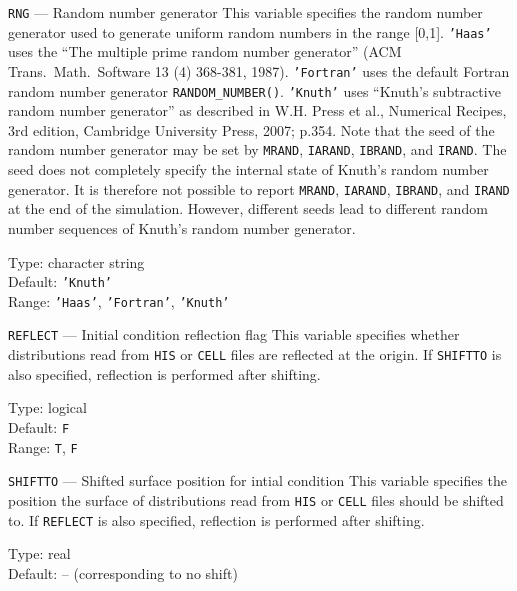 \begin{keydescription}{\texttt{RNG} --- Random number generator}
%
  This variable specifies the random number generator used to generate uniform
  random numbers in the range [0,1]. \texttt{'Haas'} uses the ``The multiple 
  prime random number generator'' (ACM Trans.\ Math.\ Software 13 (4) 368-381, 
  1987). \texttt{'Fortran'} uses the default Fortran random number generator 
  \texttt{RANDOM\_NUMBER()}. \texttt{'Knuth'} uses ``Knuth's subtractive random 
  number generator'' as described in W.H. Press et al., Numerical Recipes, 3rd 
  edition, Cambridge University Press, 2007; p.354. Note that the seed of the
  random number generator may be set by \texttt{MRAND}, \texttt{IARAND}, 
  \texttt{IBRAND}, and \texttt{IRAND}. The seed does not completely specify 
  the internal state of Knuth's random number generator. It is therefore not
  possible to report \texttt{MRAND}, \texttt{IARAND}, \texttt{IBRAND}, and
  \texttt{IRAND} at the end of the simulation. However, different seeds lead
  to different random number sequences of Knuth's random number generator.
%
  \begin{keytab}
    Type:    \> character string \\
    Default: \> \texttt{'Knuth'} \\
    Range:   \> \texttt{'Haas'}, \texttt{'Fortran'}, \texttt{'Knuth'} 
  \end{keytab}
\end{keydescription}

\begin{keydescription}{\texttt{REFLECT} --- Initial condition reflection flag}
%
  This variable specifies whether distributions read from \texttt{HIS} or
  \texttt{CELL} files are reflected at the origin. If \texttt{SHIFTTO} is also
  specified, reflection is performed after shifting.
%
  \begin{keytab}
    Type:    \> logical \\
    Default: \> \texttt{F} \\
    Range:   \> \texttt{T}, \texttt{F}
  \end{keytab}
\end{keydescription}

\begin{keydescription}{\texttt{SHIFTTO} --- Shifted surface position for intial condition}
%
  This variable specifies the position the surface of distributions read from
  \texttt{HIS} or \texttt{CELL} files should be shifted to. If \texttt{REFLECT} 
  is also specified, reflection is performed after shifting.

  \begin{keytab}
    Type:    \> real \\
    Default: \> -- (corresponding to no shift)
  \end{keytab}
\end{keydescription}

